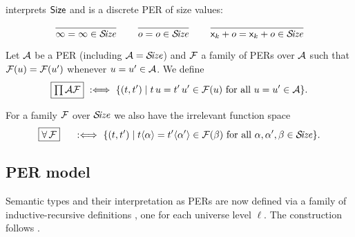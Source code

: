 \documentclass[acmsmall%
]{acmart}\settopmatter{printfolios=true}
\makeatletter
\def\cneq{\@fleqnfalse}
\makeatother
\begin{document}
\fbox{$\SIZE$} interprets $\mathsf{Size}$ and is a discrete PER of size values:
\vspace{-1ex}
\begin{gather*}
  \ru{
    }{\infty = \infty \in \SIZE}
\qquad
  \ru{
    }{o = o \in \SIZE}
\qquad
  \ru{
    }{\lev k + o = \lev k + o \in \SIZE}
\end{gather*}

Let $\mathcal{A}$ be a PER (including $\mathcal{A} = \mathcal{S}\!\mathit{ize}$) and $\mathcal{F}$ a family of PERs over $\mathcal{A}$ such that
$\mathcal{F}(u) = \mathcal{F}(u')$ whenever $u = u' \in \mathcal{A}$.  We define
\[
  \fbox{$\prod\mathcal{A}\mathcal{F}$} \mathrel{\ :\Longleftrightarrow\ } \{(t,t') \mid t\,u = t'\,u' \in \mathcal{F}(u) \ \mbox{for all}\  u = u' \in \mathcal{A} \}
  .
\]

For a family $\mathcal{F}$ over $\SIZE$ we also have the irrelevant function space
\[
  \fbox{$\forall\,\mathcal{F}$} \quad \, \mathrel{\ :\Longleftrightarrow\ }
  \{(t,t') \mid t \langle\alpha\rangle = t' \langle\alpha'\rangle \in \mathcal{F}(\beta) \ \mbox{for all}\  \alpha,\alpha',\beta \in \mathcal{S}\!\mathit{ize} \}
  .
\]
\cneq




\subsection{PER model}
\label{sec:permodel}

Semantic types and their interpretation as PERs are now defined via a
family of inductive-recursive definitions \cite{dybjer:jsl00}, one for
each universe level $\ell$.  The construction follows \citet{abelCoquandDybjer:lics07}.
\end{document}
